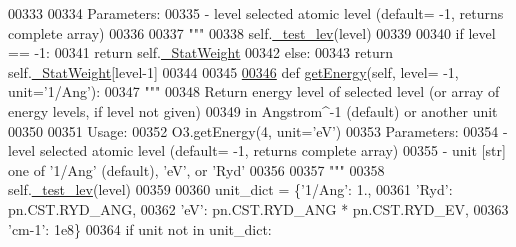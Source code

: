 \begin{DoxyCode}
00333 \textcolor{stringliteral}{                      }
00334 \textcolor{stringliteral}{        Parameters:}
00335 \textcolor{stringliteral}{            - level  selected atomic level (default= -1, returns complete array)}
00336 \textcolor{stringliteral}{            }
00337 \textcolor{stringliteral}{        """}
00338         self.\hyperlink{classpyneb_1_1utils_1_1pn__chianti_1_1___atom_chianti_a551f0c33c7ebec76c0af9e86befd29f3}{\_test\_lev}(level)
00339         
00340         \textcolor{keywordflow}{if} level == -1:
00341             \textcolor{keywordflow}{return} self.\hyperlink{classpyneb_1_1utils_1_1pn__chianti_1_1___atom_chianti_a8a718be321d05e4212ff5be195c92b42}{\_StatWeight}
00342         \textcolor{keywordflow}{else}:
00343             \textcolor{keywordflow}{return} self.\hyperlink{classpyneb_1_1utils_1_1pn__chianti_1_1___atom_chianti_a8a718be321d05e4212ff5be195c92b42}{\_StatWeight}[level-1]
00344         
00345     
\hypertarget{pn__chianti_8py_source_l00346}{}\hyperlink{classpyneb_1_1utils_1_1pn__chianti_1_1___atom_chianti_adfaee032bacec747d8a1573968d0ebf1}{00346}     \textcolor{keyword}{def }\hyperlink{classpyneb_1_1utils_1_1pn__chianti_1_1___atom_chianti_adfaee032bacec747d8a1573968d0ebf1}{getEnergy}(self, level= -1, unit='1/Ang'):
00347         \textcolor{stringliteral}{"""}
00348 \textcolor{stringliteral}{        Return energy level of selected level (or array of energy levels, if level not given) }
00349 \textcolor{stringliteral}{            in Angstrom^-1 (default) or another unit}
00350 \textcolor{stringliteral}{        }
00351 \textcolor{stringliteral}{        Usage:}
00352 \textcolor{stringliteral}{            O3.getEnergy(4, unit='eV')}
00353 \textcolor{stringliteral}{        Parameters:}
00354 \textcolor{stringliteral}{            - level  selected atomic level (default= -1, returns complete array)}
00355 \textcolor{stringliteral}{            - unit   [str] one of '1/Ang' (default), 'eV', or 'Ryd'    }
00356 \textcolor{stringliteral}{            }
00357 \textcolor{stringliteral}{        """}
00358         self.\hyperlink{classpyneb_1_1utils_1_1pn__chianti_1_1___atom_chianti_a551f0c33c7ebec76c0af9e86befd29f3}{\_test\_lev}(level)
00359 
00360         unit\_dict = \{\textcolor{stringliteral}{'1/Ang'}: 1.,
00361                      \textcolor{stringliteral}{'Ryd'}: pn.CST.RYD\_ANG,
00362                      \textcolor{stringliteral}{'eV'}: pn.CST.RYD\_ANG * pn.CST.RYD\_EV,
00363                      \textcolor{stringliteral}{'cm-1'}: 1e8\}
00364         \textcolor{keywordflow}{if} unit \textcolor{keywordflow}{not} \textcolor{keywordflow}{in} unit\_dict:

\end{DoxyCode}
